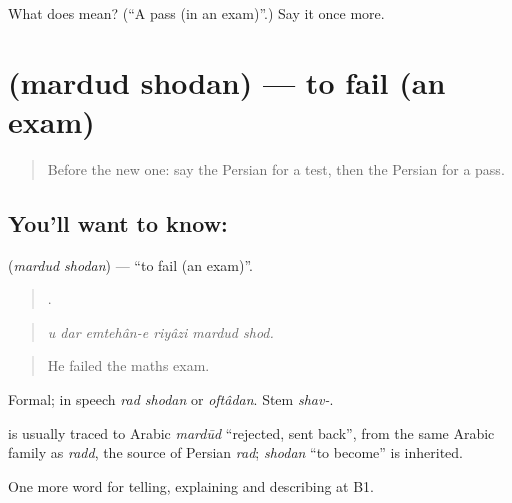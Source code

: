 \begin{tcolorbox}[breakable,colback=teal!4,colframe=teal!35!black,title={Before you move on}]
What does  mean? (\textquotedblleft{}A pass (in an exam)\textquotedblright{}.) Say it once more.
\end{tcolorbox}
\section[\texorpdfstring{\fa{مردود} \fa{شدن} (mardud shodan)}{مردود شدن (mardud shodan)}]{  (mardud shodan) — to fail (an exam)}

\label{lesson:FA-C399-mardud-shodan}



\begin{quote}
Before the new one: say the Persian for a test, then the Persian for a pass.
\end{quote}

\subsection*{You'll want to know:  }
\textbf{ } (\emph{mardud shodan}) — \textquotedblleft{}to fail (an exam)\textquotedblright{}.

\begin{quote}
     .
\end{quote}

\begin{quote}
\emph{u dar emtehân-e riyâzi mardud shod.}
\end{quote}

\begin{quote}
He failed the maths exam.
\end{quote}

Formal; in speech \emph{rad shodan} or \emph{oftâdan}. Stem \emph{shav-}.

\begin{cousinweb}
\textbf{} is usually traced to Arabic \emph{mardūd} \textquotedblleft{}rejected, sent back\textquotedblright{}, from the same Arabic family as \emph{radd}, the source of Persian \emph{rad}; \emph{shodan} \textquotedblleft{}to become\textquotedblright{} is inherited.
\end{cousinweb}

\begin{grammarlens}[title={What you've built}]
One more word for telling, explaining and describing at B1.
\end{grammarlens}

